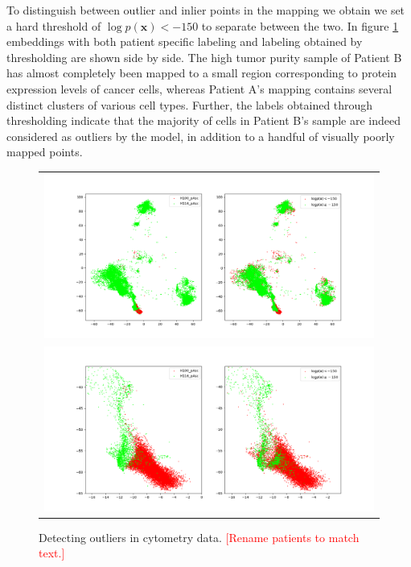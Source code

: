 To distinguish between outlier and inlier points in the mapping we obtain we set a hard threshold of $\log p(\mathbf{x}) < -150$ to separate between the two. In figure \ref{fig:cytometry_outliers} embeddings with both patient specific labeling and labeling obtained by thresholding are shown side by side. The high tumor purity sample of Patient B has almost completely been mapped to a small region corresponding to protein expression levels of cancer cells, whereas Patient A's mapping contains several distinct clusters of various cell types. Further, the labels obtained through thresholding indicate that the majority of cells in Patient B's sample are indeed considered as outliers by the model, in addition to a handful of visually poorly mapped points.

\begin{figure}[!htb]
  \centering
  \begin{tabular}{c}
    \includegraphics[width=\textwidth]{images/scored.png} \\
    \includegraphics[width=\textwidth]{images/scored_zoomed.png}
  \end{tabular}
  \caption{Detecting outliers in cytometry data. \textcolor{red}{[Rename patients to match text.]}}
  \label{fig:cytometry_outliers}
\end{figure}

